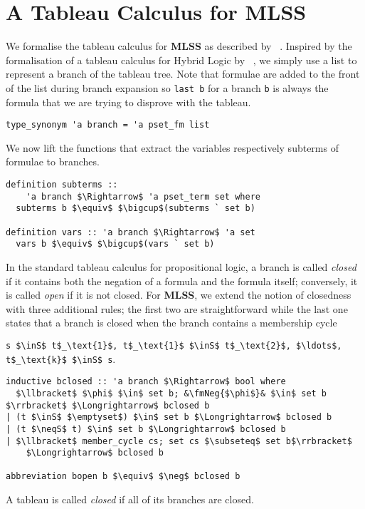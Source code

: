 \documentclass[sigplan,10pt,anonymous,review]{acmart}
\newcommand{\MLSS}{\textbf{MLSS}}
\newcommand{\inS}{\in_\text{s}}
\newcommand{\neqS}{\neq_\text{s}}
\newcommand{\fmNeg}[1]{$\boldsymbol{\neg}$ #1}
\begin{document}
\section{A Tableau Calculus for MLSS}
We formalise the tableau calculus for \MLSS{} as described by \citeauthor{new_fast_tableau}~\cite{new_fast_tableau}.
Inspired by the formalisation of a tableau calculus for Hybrid Logic by \citeauthor{hybrid_logic_afp}~\cite{hybrid_logic_afp}, we simply use a list to represent a branch of the tableau tree.
Note that formulae are added to the front of the list during branch expansion so \lstinline!last b! for a branch \lstinline!b! is always the formula that we are trying to disprove with the tableau. 
\begin{lstlisting}
type_synonym 'a branch = 'a pset_fm list
\end{lstlisting}
We now lift the functions that extract the variables respectively subterms of formulae to branches.
\begin{lstlisting}
definition subterms ::
    'a branch $\Rightarrow$ 'a pset_term set where
  subterms b $\equiv$ $\bigcup$(subterms ` set b)

definition vars :: 'a branch $\Rightarrow$ 'a set 
  vars b $\equiv$ $\bigcup$(vars ` set b)
\end{lstlisting}
In the standard tableau calculus for propositional logic, a branch is called \textit{closed} if it contains both the negation of a formula and the formula itself;
conversely, it is called \textit{open} if it is not closed.
For \MLSS{}, we extend the notion of closedness with three additional rules; the first two are straightforward while the last one states that a branch is closed when the branch contains a membership cycle
\begin{center}
\lstinline!s $\inS$ t$_\text{1}$, t$_\text{1}$ $\inS$ t$_\text{2}$, $\ldots$, t$_\text{k}$ $\inS$ s!.
\end{center}
\begin{lstlisting}
inductive bclosed :: 'a branch $\Rightarrow$ bool where
  $\llbracket$ $\phi$ $\in$ set b; &\fmNeg{$\phi$}& $\in$ set b $\rrbracket$ $\Longrightarrow$ bclosed b
| (t $\inS$ $\emptyset$) $\in$ set b $\Longrightarrow$ bclosed b
| (t $\neqS$ t) $\in$ set b $\Longrightarrow$ bclosed b
| $\llbracket$ member_cycle cs; set cs $\subseteq$ set b$\rrbracket$
    $\Longrightarrow$ bclosed b

abbreviation bopen b $\equiv$ $\neg$ bclosed b
\end{lstlisting}
A tableau is called \textit{closed} if all of its branches are closed.
\end{document}
